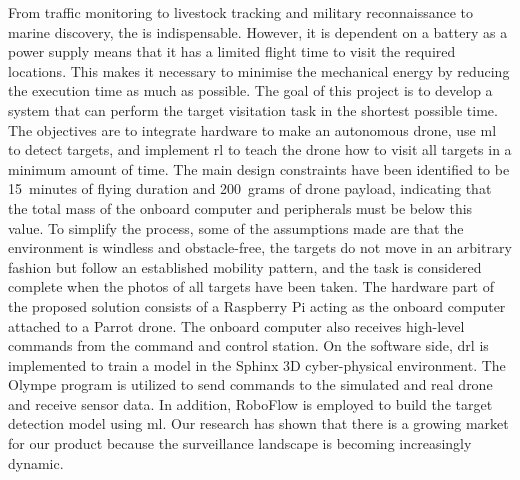 \documentclass[../main.tex]{subfiles}
\begin{document}
From traffic monitoring to livestock tracking and 
military reconnaissance to marine discovery, the \uav
is indispensable.
However, it is dependent on a battery as a power supply means
that it has a limited flight time to visit the required
locations. This makes it necessary to minimise 
the mechanical energy by reducing the execution time as much
as possible.
The goal of this project is to develop a system 
that can perform the target visitation task in the shortest
possible time. The objectives are to integrate hardware to make
an autonomous drone, use \gls{ml} 
to detect targets,
and implement \gls{rl} to 
teach the drone how to visit all targets in a minimum amount of time.
The main design constraints have been identified to be 
\SI{15}{minutes} of flying duration and \SI{200}{grams}
of drone payload, indicating that the total mass of the 
onboard computer and peripherals must be below this
value. To simplify the process, some of the assumptions
made are that the environment is windless and obstacle-free,
the targets do not move in an arbitrary fashion but follow
an established mobility pattern, and the task is considered
complete when the photos of all targets have been taken.
The hardware part of the proposed solution 
consists of a Raspberry Pi acting as the onboard computer
attached to a Parrot \anafi drone. The onboard computer
also receives high-level commands from the command and control
station. On the software side, \gls{drl} is 
implemented to train a model in the Sphinx 3D
cyber-physical environment. The Olympe program is utilized
to send commands to the simulated and real \anafi drone
and receive sensor data. In addition, RoboFlow is employed
to build the target detection model using \gls{ml}.
Our research has shown that there is a growing market for
our product because the surveillance landscape
is becoming increasingly dynamic.
\end{document}

